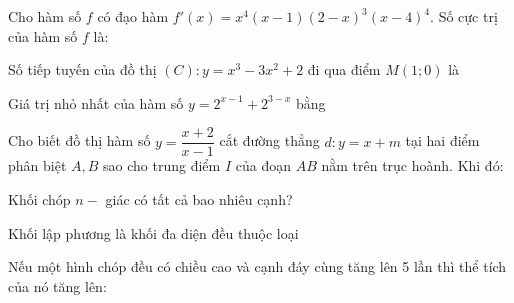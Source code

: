 \begin{question}%
Cho hàm số $f$ có đạo hàm $f'(x)=x^4(x-1)(2-x)^3(x-4)^4$. Số cực trị của hàm số $f$ là:
\vspace{0.2cm}
\datcot
\bonpa
{}
{}
{}
{}
\end{question}

\begin{question}%
Số tiếp tuyến của đồ thị $(C): y=x^3-3x^2+2$ đi qua điểm $M(1; 0)$ là
\vspace{0.2cm}
\datcot
\bonpa
{}
{}
{}
{}
\end{question}

\begin{question}%
Giá trị nhỏ nhất của hàm số $y=2^{x-1}+2^{3-x}$ bằng
\vspace{0.2cm}
\datcot
\bonpa
{}
{}
{}
{}
\end{question}

\begin{question}%
Cho biết đồ thị hàm số $y=\dfrac{x+2}{x-1}$ cắt đường thẳng $d: y=x+m$ tại hai điểm phân biệt $A, B$ sao cho trung điểm $I$ của đoạn $AB$ nằm trên trục hoành. Khi đó:
\vspace{0.2cm}
\datcot
\bonpa
{}
{}
{}
{}
\end{question}

\begin{question}%
Khối chóp $n-$ giác có tất cả bao nhiêu cạnh?
\vspace{0.2cm}
\datcot
\bonpa
{}
{}
{}
{}
\end{question}

\begin{question}%
Khối lập phương là khối đa diện đều thuộc loại
\vspace{0.2cm}
\datcot
\bonpa
{}
{}
{}
{}
\end{question}

\begin{question}%
Nếu một hình chóp đều có chiều cao và cạnh đáy cùng tăng lên 5 lần thì thể tích của nó tăng lên:
\vspace{0.2cm}
\datcot
\bonpa
{}
{}
{}
{}
\end{question}

